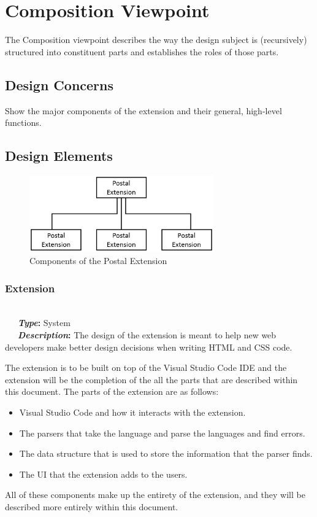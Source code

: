 \documentclass[letterpaper,10pt,titlepage,draftclsnofoot,onecolumn,onesided] {IEEEtran}
\newcommand{\bolditin}[2]{
	\-\ \-\ \-\ \textbf{\textit{#1}#2}
}
\begin{document}
\section{Composition Viewpoint}
The Composition viewpoint describes the way the design subject is (recursively) structured into constituent
parts and establishes the roles of those parts. 
\subsection{Design Concerns}
Show the major components of the extension and their general, high-level functions.
\subsection{Design Elements}
\begin{figure} %
	\includegraphics[width=300px]{CompositionUMLEPS.eps}
	\caption{Components of the Postal Extension}
\end{figure}

\subsubsection{Extension}
\hfill \\
\bolditin{Type}{:} System \\
\bolditin{Description}{:} The design of the extension is meant to help new web developers make better design decisions when writing HTML and CSS code. 

The extension is to be built on top of the Visual Studio Code IDE and the extension will be the completion of the all the parts that are described within this document. 
The parts of the extension are as follows:
\begin{itemize}
	\item Visual Studio Code and how it interacts with the extension.
	\item The parsers that take the language and parse the languages and find errors.
	\item The data structure that is used to store the information that the parser finds.
	\item The UI that the extension adds to the users. 
\end{itemize}
All of these components make up the entirety of the extension, and they will be described more entirely within this document. 
	
\end{document}
